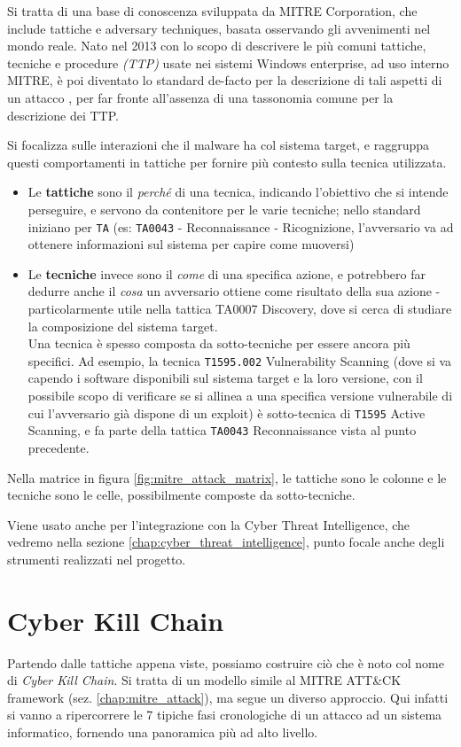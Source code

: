 Si tratta di una base di conoscenza sviluppata da MITRE Corporation, che include tattiche e adversary techniques, basata osservando gli avvenimenti nel mondo reale. Nato nel 2013 con lo scopo di descrivere le più comuni tattiche, tecniche e procedure \emph{(TTP)} usate nei sistemi Windows enterprise, ad uso interno MITRE, è poi diventato lo standard de-facto per la descrizione di tali aspetti di un attacco
\cite{mitre_attack_framework_introduction}, per far fronte all'assenza di una tassonomia comune per la descrizione dei TTP.

Si focalizza sulle interazioni che il malware ha col sistema target, e raggruppa questi comportamenti in tattiche per fornire più contesto sulla tecnica utilizzata.
\begin{itemize}
    \item Le \textbf{tattiche} sono il \emph{perché} di una tecnica, indicando l'obiettivo che si intende perseguire, e servono da contenitore per le varie tecniche; nello standard iniziano per \texttt{TA} (es: \texttt{TA0043} - Reconnaissance - Ricognizione, l'avversario va ad ottenere informazioni sul sistema per capire come muoversi)
    \item Le \textbf{tecniche} invece sono il \emph{come} di una specifica azione, e potrebbero far dedurre anche il \emph{cosa} un avversario ottiene come risultato della sua azione - particolarmente utile nella tattica TA0007 Discovery, dove si cerca di studiare la composizione del sistema target. \\
    Una tecnica è spesso composta da sotto-tecniche per essere ancora più specifici.
    Ad esempio, la tecnica \texttt{T1595.002} Vulnerability Scanning (dove si va capendo i software disponibili sul sistema target e la loro versione, con il possibile scopo di verificare se si allinea a una specifica versione vulnerabile di cui l'avversario già dispone di un exploit) è sotto-tecnica di \texttt{T1595} Active Scanning, e fa parte della tattica \texttt{TA0043} Reconnaissance vista al punto precedente.
\end{itemize}

Nella matrice in figura \ref{fig:mitre_attack_matrix}, le tattiche sono le colonne e le tecniche sono le celle, possibilmente composte da sotto-tecniche.

Viene usato anche per l'integrazione con la Cyber Threat Intelligence, che vedremo nella sezione \ref{chap:cyber_threat_intelligence}, punto focale anche degli strumenti realizzati nel progetto.

\section{Cyber Kill Chain}
Partendo dalle tattiche appena viste, possiamo costruire ciò che è noto col nome di \emph{Cyber Kill Chain}.
Si tratta di un modello simile al MITRE ATT\&CK framework (sez. \ref{chap:mitre_attack}), ma segue un diverso approccio. Qui infatti si vanno a ripercorrere le 7 tipiche fasi cronologiche di un attacco ad un sistema informatico, fornendo una panoramica più ad alto livello.

